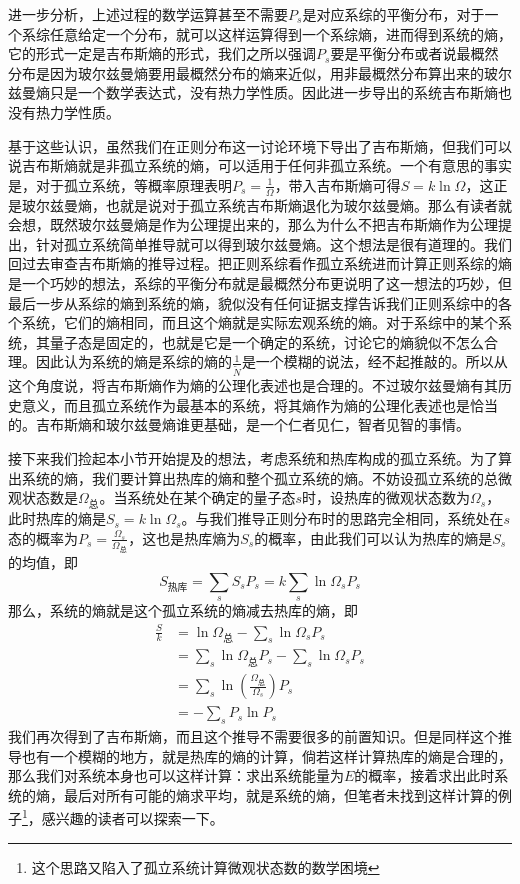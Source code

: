 \documentclass[../../main.tex]{subfiles}
\begin{document}
进一步分析，上述过程的数学运算甚至不需要\(P_s\)是对应系综的平衡分布，对于一个系综任意给定一个分布，就可以这样运算得到一个系综熵，进而得到系统的熵，它的形式一定是吉布斯熵的形式，我们之所以强调\(P_s\)要是平衡分布或者说最概然分布是因为玻尔兹曼熵要用最概然分布的熵来近似，用非最概然分布算出来的玻尔兹曼熵只是一个数学表达式，没有热力学性质。因此进一步导出的系统吉布斯熵也没有热力学性质。

基于这些认识，虽然我们在正则分布这一讨论环境下导出了吉布斯熵，但我们可以说吉布斯熵就是非孤立系统的熵，可以适用于任何非孤立系统。一个有意思的事实是，对于孤立系统，等概率原理表明\(P_s=\frac{1}{\Omega}\)，带入吉布斯熵可得\(S=k\ln\Omega\)，这正是玻尔兹曼熵，也就是说对于孤立系统吉布斯熵退化为玻尔兹曼熵。那么有读者就会想，既然玻尔兹曼熵是作为公理提出来的，那么为什么不把吉布斯熵作为公理提出，针对孤立系统简单推导就可以得到玻尔兹曼熵。这个想法是很有道理的。我们回过去审查吉布斯熵的推导过程。把正则系综看作孤立系统进而计算正则系综的熵是一个巧妙的想法，系综的平衡分布就是最概然分布更说明了这一想法的巧妙，但最后一步从系综的熵到系统的熵，貌似没有任何证据支撑告诉我们正则系综中的各个系统，它们的熵相同，而且这个熵就是实际宏观系统的熵。对于系综中的某个系统，其量子态是固定的，也就是它是一个确定的系统，讨论它的熵貌似不怎么合理。因此认为系统的熵是系综的熵的\(\displaystyle \frac{1}{\tilde{N}}\)是一个模糊的说法，经不起推敲的。所以从这个角度说，将吉布斯熵作为熵的公理化表述也是合理的。不过玻尔兹曼熵有其历史意义，而且孤立系统作为最基本的系统，将其熵作为熵的公理化表述也是恰当的。吉布斯熵和玻尔兹曼熵谁更基础，是一个仁者见仁，智者见智的事情。

接下来我们捡起本小节开始提及的想法，考虑系统和热库构成的孤立系统。为了算出系统的熵，我们要计算出热库的熵和整个孤立系统的熵。不妨设孤立系统的总微观状态数是\(\Omega_{\text{总}}\)。当系统处在某个确定的量子态\(s\)时，设热库的微观状态数为\(\Omega_s\)，此时热库的熵是\(S_s=k\ln\Omega_s\)。与我们推导正则分布时的思路完全相同，系统处在\(s\)态的概率为\(P_s=\frac{\Omega_s}{\Omega_{\text{总}}}\)，这也是热库熵为\(S_s\)的概率，由此我们可以认为热库的熵是\(S_s\)的均值，即
\begin{equation}
    S_{\text{热库}}=\sum_s S_sP_s=k\sum_s \ln\Omega_s P_s
\end{equation}
那么，系统的熵就是这个孤立系统的熵减去热库的熵，即
\begin{equation}
    \begin{split}
        \frac{S}{k}&=\ln\Omega_{\text{总}}-\sum_s \ln\Omega_s P_s \\
        &=\sum_s\ln\Omega_{\text{总}}P_s-\sum_s \ln\Omega_s P_s \\
        &=\sum_s\ln(\frac{\Omega_{\text{总}}}{\Omega_s})P_s \\
        &=-\sum_sP_s\ln P_s
    \end{split}
\end{equation}
我们再次得到了吉布斯熵，而且这个推导不需要很多的前置知识。但是同样这个推导也有一个模糊的地方，就是热库的熵的计算，倘若这样计算热库的熵是合理的，那么我们对系统本身也可以这样计算：求出系统能量为\(E\)的概率，接着求出此时系统的熵，最后对所有可能的熵求平均，就是系统的熵，但笔者未找到这样计算的例子\footnote{这个思路又陷入了孤立系统计算微观状态数的数学困境}，感兴趣的读者可以探索一下。
\end{document}
